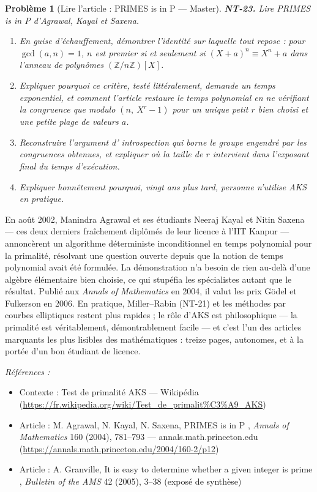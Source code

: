 \documentclass[11pt]{article}
\newtheorem{problem}{Problème}
\newenvironment{refs}{\par\small\noindent\emph{Références :}\begin{itemize}\setlength\itemsep{0pt}}{\end{itemize}\normalsize}
\begin{document}
\bigskip

\begin{problem}[{Lire l'article : PRIMES is in P --- Master}]
\textbf{NT-23.} Lire \og{} PRIMES is in P \fg{} d'Agrawal, Kayal et Saxena.
\begin{enumerate}
\item[(i)] En guise d'échauffement, démontrer l'identité sur laquelle tout repose : pour
$\gcd(a, n) = 1$, $n$ est premier si et seulement si
$(X + a)^n \equiv X^n + a$ dans l'anneau de polynômes $(\mathbb{Z}/n\mathbb{Z})[X]$.
\item[(ii)] Expliquer pourquoi ce critère, testé littéralement, demande un temps exponentiel, et comment
l'article restaure le temps polynomial en ne vérifiant la congruence que modulo
$(n,\ X^r - 1)$ pour un unique petit $r$ bien choisi et une petite plage de valeurs $a$.
\item[(iii)] Reconstruire l'argument d'\og{} introspection \fg{} qui borne le groupe engendré par les
congruences obtenues, et expliquer où la taille de $r$ intervient dans l'exposant final du temps
d'exécution.
\item[(iv)] Expliquer honnêtement pourquoi, vingt ans plus tard, personne n'utilise AKS en
pratique.
\end{enumerate}

\end{problem}

\noindent En août 2002, Manindra Agrawal et ses étudiants Neeraj Kayal et
Nitin Saxena --- ces deux derniers fraîchement diplômés de leur licence à l'IIT Kanpur ---
annoncèrent un algorithme déterministe inconditionnel en temps polynomial pour la primalité,
résolvant une question ouverte depuis que la notion de temps polynomial avait été formulée.
La démonstration n'a besoin de rien au-delà d'une algèbre élémentaire bien choisie, ce qui stupéfia
les spécialistes autant que le résultat. Publié aux \textit{Annals of Mathematics} en 2004, il valut
les prix Gödel et Fulkerson en 2006. En pratique, Miller--Rabin (NT-21) et les méthodes par courbes
elliptiques restent plus rapides ; le rôle d'AKS est philosophique --- la primalité est véritablement,
démontrablement facile --- et c'est l'un des articles marquants les plus lisibles des mathématiques :
treize pages, autonomes, et à la portée d'un bon étudiant de licence.

\begin{refs}
\item Contexte : Test de primalité AKS --- Wikipédia (\url{https://fr.wikipedia.org/wiki/Test_de_primalit%C3%A9_AKS})
\item Article : M. Agrawal, N. Kayal, N. Saxena, \og{} PRIMES is in P \fg{}, \textit{Annals of Mathematics} 160 (2004), 781--793 --- annals.math.princeton.edu (\url{https://annals.math.princeton.edu/2004/160-2/p12})
\item Article : A. Granville, \og{} It is easy to determine whether a given integer is prime \fg{}, \textit{Bulletin of the AMS} 42 (2005), 3--38 (exposé de synthèse)
\end{refs}
\end{document}
